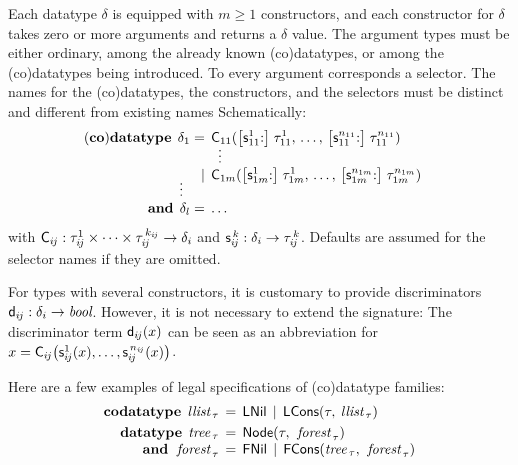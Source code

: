 Each datatype $\delta$ is equipped with
$m \ge 1$ constructors, and each constructor for $\delta$ takes zero or more
arguments and returns a $\delta$ value. The argument types must be either
ordinary, among the already known (co)datatypes, or among the (co)datatypes
being introduced.
%
To every argument corresponds a selector. The names for the (co)data\-types, the
constructors, and the selectors must be distinct and different from
existing names%
Schematically:
%
\[
\begin{aligned}[t]
(\keyw{co})\keyw{datatype}\;\,
  \delta_1 & {}=\, \smash{\const{C}_{11}(\bigl[\const{s}_{11}^1{:}\bigr]\; \tau_{11}^1, \,\ldots,\, \bigl[\const{s}_{11}^{n_{11}}{:}\bigr]\; \tau_{11}^{n_{11}})} & \\
           & {}\;\phantom{=\,}\;{} \smash{\,\,\,\vdots} \\[-\jot] %
           & {}\;\phantom{=\,}\llap{\ensuremath{\,\mid\,}}\; \smash{\const{C}_{1m}(\bigl[\const{s}_{1m}^1{:}\bigr]\; \tau_{1m}^1, \,\ldots,\, \big[\const{s}_{1m}^{n_{1m}}{:}\big]\; \tau_{1m}^{n_{1m}})} \\[-1\jot]
   \smash{\vdots\,\,\,} \\[-1\jot]
  \keyw{and}\; \,\delta_l & =\, \ldots
\end{aligned}
\]
%
with
$\textsf{C}_{i\kern-0.083333em j} : \tau_{i\kern-0.083333em j}^1\times\cdots\times\tau_{i\kern-0.083333em j}^{\,k_{\smash{i\kern-0.083333em j}}} \to \delta_i$
and $\textsf{s}_{i\kern-0.083333em j}^{\,k} : \delta_i \to \tau_{i\kern-0.083333em j}^{\,k}$. Defaults are assumed for
the selector names if they are omitted.

For types with several constructors, it is customary to provide discriminators
$\textsf{d}_{i\kern-0.083333em j} : \delta_i \to \textit{bool}$. However,
it is not necessary to extend the signature:
The discriminator term $\textsf{d}_{i\kern-0.083333em j}(x)$ can be seen as an abbreviation for
$x = \textsf{C}_{i\kern-0.083333em j}\bigl(\textsf{s}_{i\kern-0.083333em j}^1(x), \ldots, \textsf{s}_{i\kern-0.083333em j}^{\,n_{\smash{{i\kern-0.083333em j}}}}(x)\bigr)$.

Here are a few examples of legal specifications of (co)datatype families:
\[\begin{aligned}[t]
      \keyw{codatatype}\; \,\ty{llist}_{\,\tau} & \,=\, \const{LNil} \,\mid\, \const{LCons}(%
      \tau,\: %
      \ty{llist}_{\,\tau}) \\%
      \keyw{datatype}\;\, \ty{tree}_{\,\tau} & \,=\, \const{Node}(\tau,\:\, \ty{forest}_{\,\tau}) \\[-\jot]
      \keyw{and}\;\,\, \ty{forest}_{\,\tau} & \,=\, \const{FNil} \,\mid\, \const{FCons}(\ty{tree}_{\,\tau},\:\, \ty{forest}_{\,\tau})
\end{aligned}
\]

